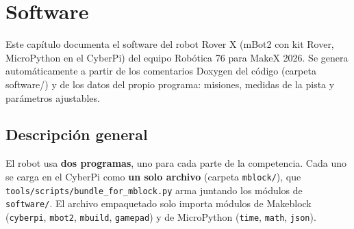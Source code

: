 \chapter{Software}\label{chap:software}
Este capítulo documenta el software del robot Rover X (mBot2 con kit Rover, MicroPython en el CyberPi) del equipo Robótica 76 para MakeX 2026. Se genera automáticamente a partir de los comentarios Doxygen del código (carpeta software/) y de los datos del propio programa: misiones, medidas de la pista y parámetros ajustables.

\section{Descripci\'on general}
El robot usa \textbf{dos programas}, uno para cada parte de la competencia. Cada uno se carga en el CyberPi como \textbf{un solo archivo} (carpeta \texttt{mblock/}), que \texttt{tools/scripts/bundle\_for\_mblock.py} arma juntando los m\'odulos de \texttt{software/}. El archivo empaquetado solo importa m\'odulos de Makeblock (\texttt{cyberpi}, \texttt{mbot2}, \texttt{mbuild}, \texttt{gamepad}) y de MicroPython (\texttt{time}, \texttt{math}, \texttt{json}).

